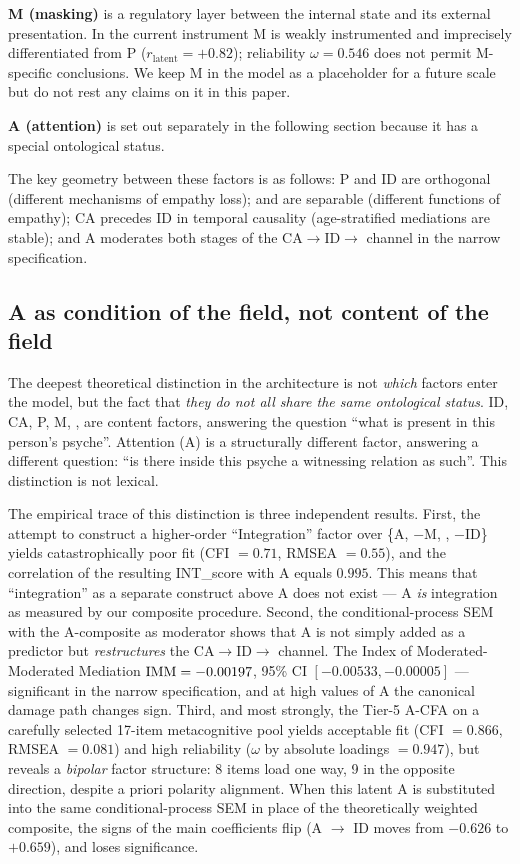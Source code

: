 \textbf{M (masking)} is a regulatory layer between the internal state and its external presentation. In the current instrument M is weakly instrumented and imprecisely differentiated from P ($r_{\mathrm{latent}} = +0.82$); reliability $\omega = 0.546$ does not permit M-specific conclusions. We keep M in the model as a placeholder for a future scale but do not rest any claims on it in this paper.

\textbf{A (attention)} is set out separately in the following section because it has a special ontological status.

The key geometry between these factors is as follows: P and ID are orthogonal (different mechanisms of empathy loss); \EAF{} and \Ecog{} are separable (different functions of empathy); CA precedes ID in temporal causality (age-stratified mediations are stable); and A moderates both stages of the CA$\to$ID$\to$\EAF{} channel in the narrow specification.

\subsection{A as condition of the field, not content of the field}
\label{subsec:A_as_field_condition}

The deepest theoretical distinction in the \DEIC{} architecture is not \emph{which} factors enter the model, but the fact that \emph{they do not all share the same ontological status}. ID, CA, P, M, \EAF{}, \Ecog{} are content factors, answering the question ``what is present in this person's psyche''. Attention (A) is a structurally different factor, answering a different question: ``is there inside this psyche a witnessing relation as such''. This distinction is not lexical.

The empirical trace of this distinction is three independent results. First, the attempt to construct a higher-order ``Integration'' factor over \{A, $-$M, \EAF{}, $-$ID\} yields catastrophically poor fit (CFI $= 0.71$, RMSEA $= 0.55$), and the correlation of the resulting INT\_score with A equals $0.995$. This means that ``integration'' as a separate construct above A does not exist --- A \emph{is} integration as measured by our composite procedure. Second, the conditional-process SEM with the A-composite as moderator shows that A is not simply added as a predictor but \emph{restructures} the CA$\to$ID$\to$\EAF{} channel. The Index of Moderated-Moderated Mediation $\mathrm{IMM} = -0.00197$, 95\% CI $[-0.00533, -0.00005]$ --- significant in the narrow specification, and at high values of A the canonical damage path changes sign. Third, and most strongly, the Tier-5 A-CFA on a carefully selected 17-item metacognitive pool yields acceptable fit (CFI $= 0.866$, RMSEA $= 0.081$) and high reliability ($\omega$ by absolute loadings $= 0.947$), but reveals a \emph{bipolar} factor structure: 8 items load one way, 9 in the opposite direction, despite a priori polarity alignment. When this latent A is substituted into the same conditional-process SEM in place of the theoretically weighted composite, the signs of the main coefficients flip (A $\to$ ID moves from $-0.626$ to $+0.659$), and \IMM{} loses significance.

